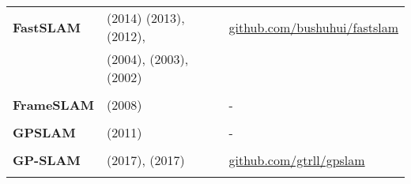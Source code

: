 \documentclass[a4paper,12pt]{scrartcl}
\begin{document}
{\begin{longtable}{l|l|l}
    \textbf{FastSLAM}      & \cite{Abouzahir2014} (2014) \cite{Naminski2013} (2013), \cite{Kurt-Yavuz2012} (2012),       & {\href{https://github.com/bushuhui/fastslam}{github.com/bushuhui/fastslam}}                                                  \\
                           & \cite{Thrun2004} (2004), \cite{Montemerlo2003} (2003), \cite{Montemerlo2002} (2002)         &                                                                                                                              \\
                           &                                                                                             &                                                                                                                              \\ [-3mm]
    \textbf{FrameSLAM}     & \cite{Konolige2008} (2008)                                                                  & -                                                                                                                            \\
                           &                                                                                             &                                                                                                                              \\ [-3mm]
    \textbf{GPSLAM}        & \cite{Pirker2011a} (2011)                                                                   & -                                                                                                                            \\
                           &                                                                                             &                                                                                                                              \\ [-3mm]
    \textbf{GP-SLAM}       & \cite{Yan2017} (2017), \cite{Dong2017} (2017)                                               & {\href{https://github.com/gtrll/gpslam}{github.com/gtrll/gpslam}}                                                            \\
                           &                                                                                             &                                                                                                                              \\ [-3mm]

\end{longtable}}
\end{document}
